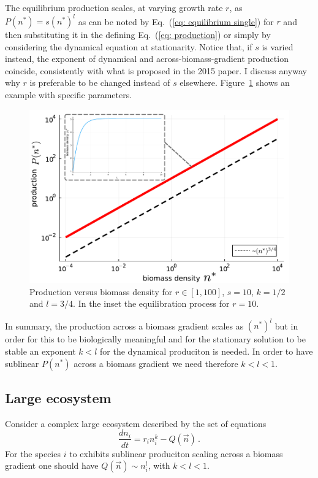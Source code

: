 \documentclass[10pt]{article}
\begin{document}
The equilibrium production scales, at varying growth rate $r$,
as $P(n^*)=s(n^*)^l$ as can be noted by Eq.~(\ref{eq: equilibrium single})
for $r$ and then substituting it in the defining Eq.~(\ref{eq: production})
or simply by considering the dynamical equation at stationarity.
Notice that, if $s$ is varied instead, the exponent
of dynamical and across-biomass-gradient production coincide, 
consistently with what is proposed in the 2015 paper.
I discuss anyway why $r$ is preferable to be changed instead of $s$ elsewhere.
Figure~\ref{fig. example} shows an example with specific parameters.

\begin{figure}[h!]
    \centering
    \includegraphics[width=.8\textwidth]{fig/single-pop.pdf}
    \caption{Production versus biomass density for $r\in[1,100]$,
    $s=10$, $k=1/2$ and $l=3/4$. In the inset the equilibration process
    for $r=10$.}
    \label{fig. example}
\end{figure}

In summary, the production across a biomass gradient 
scales as $(n^*)^l$ but in order for this to be biologically meaningful
and for the stationary solution to be stable an exponent $k<l$
for the dynamical produciton is needed.
In order to have sublinear $P(n^*)$ across a biomass gradient
we need therefore $k<l<1$.

\subsection{Large ecosystem}
Consider a complex large ecosystem 
described by the set of equations
\begin{equation}
\frac{dn_i}{dt} = r_in_i^k - Q(\vec{n}) \, .   
\end{equation}
For the species $i$ to exhibits
sublinear produciton scaling across a biomass gradient
one should have $Q(\vec{n})\sim n_i^l$, with $k<l<1$.


\newpage




\end{document}
